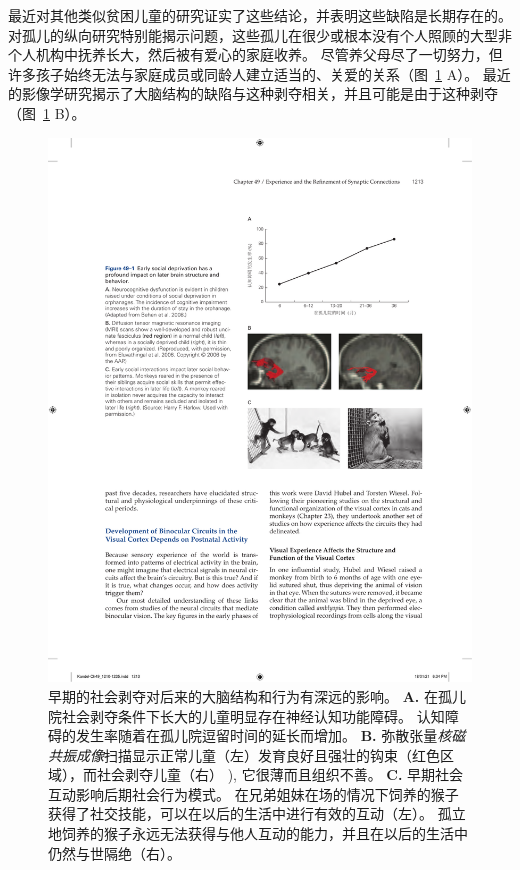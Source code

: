 最近对其他类似贫困儿童的研究证实了这些结论，并表明这些缺陷是长期存在的。
对孤儿的纵向研究特别能揭示问题，这些孤儿在很少或根本没有个人照顾的大型非个人机构中抚养长大，然后被有爱心的家庭收养。
尽管养父母尽了一切努力，但许多孩子始终无法与家庭成员或同龄人建立适当的、关爱的关系（图~\ref{fig:49_1} A）。
最近的影像学研究揭示了大脑结构的缺陷与这种剥夺相关，并且可能是由于这种剥夺（图~\ref{fig:49_1} B）。


\begin{figure}[htbp]
	\centering
	\includegraphics[width=0.9\linewidth]{chap49/fig_49_1}
	\caption{早期的社会剥夺对后来的大脑结构和行为有深远的影响。
		\textbf{A.} 在孤儿院社会剥夺条件下长大的儿童明显存在神经认知功能障碍。
		认知障碍的发生率随着在孤儿院逗留时间的延长而增加\cite{behen2008incidence}。
		\textbf{B.} 弥散张量\textit{核磁共振成像}扫描显示正常儿童（左）发育良好且强壮的钩束（红色区域），而社会剥夺儿童（右） ), 它很薄而且组织不善\cite{eluvathingal2006abnormal}。
		\textbf{C.} 早期社会互动影响后期社会行为模式。
		在兄弟姐妹在场的情况下饲养的猴子获得了社交技能，可以在以后的生活中进行有效的互动（左）。
		孤立地饲养的猴子永远无法获得与他人互动的能力，并且在以后的生活中仍然与世隔绝（右）。}
	\label{fig:49_1}
\end{figure}


